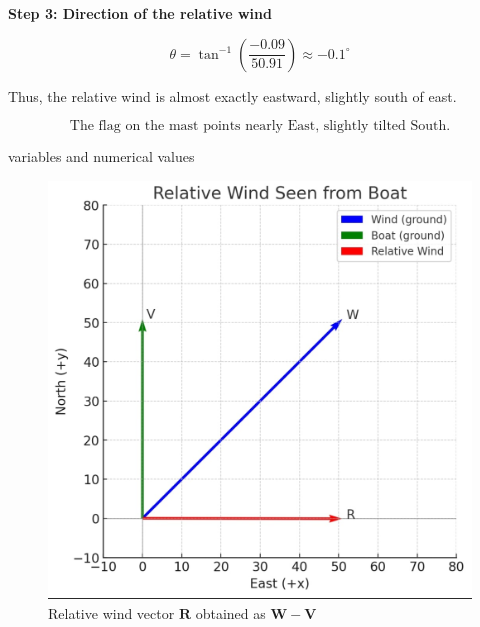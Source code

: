 \documentclass[journal]{IEEEtran}
\begin{document}
\textbf{Step 3: Direction of the relative wind}

\[
\theta = \tan^{-1}\left(\frac{-0.09}{50.91}\right) \approx -0.1^\circ
\]

Thus, the relative wind is almost exactly eastward, slightly south of east.

\[
\boxed{\text{The flag on the mast points nearly East, slightly tilted South.}}
\]



\begin{table}[h!]    
      \centering
      
      \caption{variables and numerical values}
    \end{table}


\begin{figure}[htbp]
\centering
\includegraphics[width=0.8\columnwidth]{figs/python image.png} 
\caption{Relative wind vector $\mathbf{R}$ obtained as $\mathbf{W}-\mathbf{V}$}
\label{fig:wind}
\end{figure}
\end{document}
